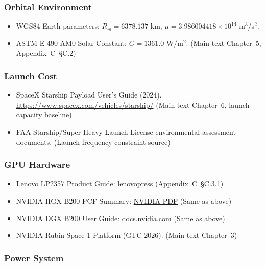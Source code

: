 \subsubsection{Orbital Environment}

\begin{itemize}
  \item WGS84 Earth parameters: $R_{\oplus} = 6378.137$ km, $\mu = 3.986004418 \times 10^{14}$ m$^3$/s$^2$.
  \item ASTM E-490 AM0 Solar Constant: $G = 1361.0$ W/m$^2$. (Main text Chapter~5, Appendix~C~\S C.2)
\end{itemize}

\subsubsection{Launch Cost}

\begin{itemize}
  \item SpaceX Starship Payload User's Guide (2024). \url{https://www.spacex.com/vehicles/starship/} (Main text Chapter~6, launch capacity baseline)
  \item FAA Starship/Super Heavy Launch License environmental assessment documents. (Launch frequency constraint source)
\end{itemize}

\subsubsection{GPU Hardware}

\begin{itemize}
  \item Lenovo LP2357 Product Guide: \href{https://lenovopress.lenovo.com/lp2357-lenovo-nvidia-gb300-nvl72-rack-scale-ai}{lenovopress} (Appendix~C~\S C.3.1)
  \item NVIDIA HGX B200 PCF Summary: \href{https://images.nvidia.com/aem-dam/Solutions/documents/HGX-B200-PCF-Summary.pdf}{NVIDIA PDF} (Same as above)
  \item NVIDIA DGX B200 User Guide: \href{https://docs.nvidia.com/dgx/dgxb200-user-guide/introduction-to-dgxb200.html}{docs.nvidia.com} (Same as above)
  \item NVIDIA Rubin Space-1 Platform (GTC 2026). (Main text Chapter~3)
\end{itemize}

\subsubsection{Power System}

